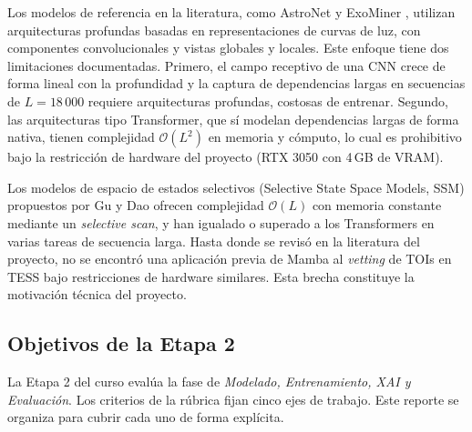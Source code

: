 \documentclass[11pt,a4paper]{article}
\begin{document}
Los modelos de referencia en la literatura, como AstroNet
\cite{shallue2018} y ExoMiner \cite{exominer}, utilizan arquitecturas
profundas basadas en representaciones de curvas de luz, con componentes
convolucionales y vistas globales y locales. Este enfoque tiene dos
limitaciones documentadas. Primero, el campo receptivo de una CNN crece
de forma lineal con la profundidad y la captura de dependencias largas
en secuencias de $L=18\,000$ requiere arquitecturas profundas, costosas
de entrenar. Segundo, las arquitecturas tipo Transformer, que sí modelan
dependencias largas de forma nativa, tienen complejidad $\mathcal{O}(L^2)$
en memoria y cómputo, lo cual es prohibitivo bajo la restricción de
hardware del proyecto (RTX 3050 con 4\,GB de VRAM).

Los modelos de espacio de estados selectivos (Selective State Space Models,
SSM) propuestos por Gu y Dao \cite{gu2023mamba} ofrecen complejidad
$\mathcal{O}(L)$ con memoria constante mediante un \textit{selective scan},
y han igualado o superado a los Transformers en varias tareas de secuencia
larga. Hasta donde se revisó en la literatura del proyecto, no se
encontró una aplicación previa de Mamba al \textit{vetting} de TOIs en
TESS bajo restricciones de hardware similares. Esta brecha constituye
la motivación técnica del proyecto.

\subsection{Objetivos de la Etapa 2}
\label{subsec:objetivos}

La Etapa 2 del curso evalúa la fase de
\textit{Modelado, Entrenamiento, XAI y Evaluación}. Los criterios de la
rúbrica fijan cinco ejes de trabajo. Este reporte se organiza para
cubrir cada uno de forma explícita.
\end{document}
